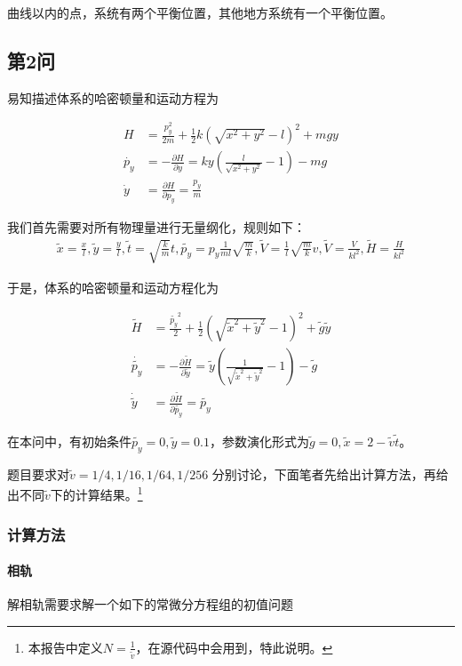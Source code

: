 \documentclass[10pt, a4paper]{article}
\newcommand{\wx}{\widetilde{x}}
\newcommand{\wy}{\widetilde{y}}
\newcommand{\wg}{\widetilde{g}}
\newcommand{\wV}{\widetilde{V}}
\newcommand{\wH}{\widetilde{H}}
\newcommand{\wt}{\widetilde{t}}
\newcommand{\wpy}{\widetilde{p_y}}
\newcommand{\wv}{\widetilde{v}}
\begin{document}
    曲线以内的点，系统有两个平衡位置，其他地方系统有一个平衡位置。

    \subsection{第2问}

    易知描述体系的哈密顿量和运动方程为

    \begin{align}
        H&=\frac{p_y^2}{2m}+\frac{1}{2}k(\sqrt{x^2+y^2}-l)^2+mgy\\
        \dot{p_y}&=-\frac{\partial H}{\partial y}=ky(\frac{l}{\sqrt{x^2+y^2}}-1)-mg\\
        \dot{y}&=\frac{\partial H}{\partial p_y}=\frac{p_y}{m}
    \end{align}

    我们首先需要对所有物理量进行无量纲化，规则如下：
    \begin{align}
        \wx=\frac{x}{l},\wy=\frac{y}{l},\wt=\sqrt{\frac{k}{m}}t,\wpy=p_y\frac{1}{ml}\sqrt{\frac{m}{k}},\wV=\frac{1}{l}\sqrt{\frac{m}{k}}v,\wV=\frac{V}{kl^2},\wH=\frac{H}{kl^2}
    \end{align}

    于是，体系的哈密顿量和运动方程化为

    \begin{align}
        \wH&=\frac{\wpy^2}{2}+\frac{1}{2}(\sqrt{\wx^2+\wy^2}-1)^2+\wg\wy\\
        \dot{\wpy}&=-\frac{\partial \wH}{\partial \wy}=\wy(\frac{1}{\sqrt{\wx^2+\wy^2}}-1)-\wg\\
        \dot{\wy}&=\frac{\partial \wH}{\partial \wpy}=\wpy
    \end{align}
    
    在本问中，有初始条件$\wpy=0,\wy=0.1$，参数演化形式为$\wg=0,\wx=2-\wv\wt$。

    题目要求对$\wv=1/4,1/16,1/64,1/256$
    分别讨论，下面笔者先给出计算方法，再给出不同$\wv$下的计算结果。\footnote{本报告中定义$N=\frac{1}{\wv}$，在源代码中会用到，特此说明。}

    \subsubsection{计算方法}
    \paragraph{相轨}

    解相轨需要求解一个如下的常微分方程组的初值问题
\end{document}
